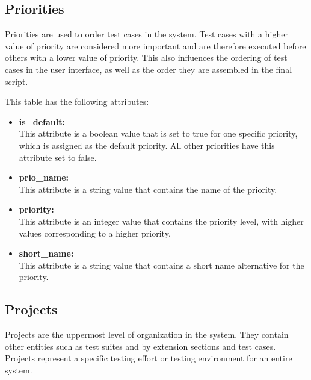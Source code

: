 \subsection{Priorities}

Priorities are used to order test cases in the system. Test cases with a higher value of priority are considered more important and are therefore executed before others with a lower value of priority. This also influences the ordering of test cases in the user interface, as well as the order they are assembled in the final script.

This table has the following attributes:~\cite{TRPriorities}
\begin{itemize}
    \item \textbf{is_default:} \\
    This attribute is a boolean value that is set to true for one specific priority, which is assigned as the default priority. All other priorities have this attribute set to false.

    \item \textbf{prio_name:} \\
    This attribute is a string value that contains the name of the priority.

    \item \textbf{priority:} \\
    This attribute is an integer value that contains the priority level, with higher values corresponding to a higher priority.

    \item \textbf{short_name:} \\
    This attribute is a string value that contains a short name alternative for the priority.
\end{itemize}

\subsection{Projects}

Projects are the uppermost level of organization in the system. They contain other entities such as test suites and by extension sections and test cases. Projects represent a specific testing effort or testing environment for an entire system.

